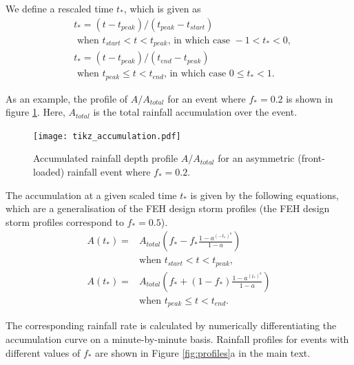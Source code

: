 \documentclass[APA,Times2COL]{WileyNJDv5}
\begin{document}
We define a rescaled time $t_*$, which is given as
\begin{align*}
&t_*=(t-t_{peak})/(t_{peak}-t_{start}) \\ & \textrm{ when } t_{start} <t<t_{peak} \textrm{, in which case } -1<t_*<0, \\
&t_*=(t-t_{peak})/(t_{end}-t_{peak}) \\ & \textrm{ when } t_{peak} \leq t<t_{end} \textrm{, in which case } 0 \leq t_*<1. 
\end{align*}

As an example, the profile of $A/A_{total}$ for an event where $f_*=0.2$ is shown in figure \ref{fig:accprof}. Here, $A_{total}$ is the total rainfall accumulation over the event. 

\begin{figure}
\texttt{[image: tikz\_accumulation.pdf]}
\caption{Accumulated rainfall depth profile $A/A_{total}$ for an asymmetric (front-loaded) rainfall event where $f_*=0.2$.}
\label{fig:accprof}
\end{figure}

The accumulation at a given scaled time $t_*$ is given by the following equations, which are a generalisation of the FEH design storm profiles (the FEH design storm profiles correspond to $f_*=0.5$). 
\begin{align*}
A(t_*) = & A_{total}\left(f_*-f_* \frac{1-a^{(-t_*)^b}}{1-a} \right) \\ & \textrm{when } t_{start}<t<t_{peak}, \\
A(t_*) = & A_{total}\left(f_*+(1-f_*) \frac{1-a^{(t_*)^b}}{1-a} \right) \\\ & \textrm{when } t_{peak} \leq t<t_{end}.  
\end{align*}

The corresponding rainfall rate is calculated by numerically differentiating the accumulation curve on a minute-by-minute basis. Rainfall profiles for events with different values of $f_*$ are shown in Figure \ref{fig:profiles}a in the main text.

\newpage
\clearpage

\end{document}
